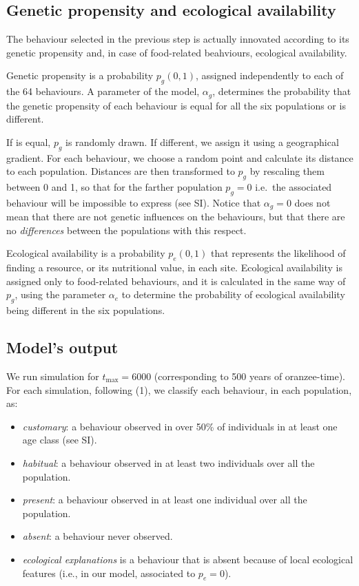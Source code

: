 \documentclass[9pt,twocolumn,twoside,]{pnas-new}
\begin{document}
\subsection*{Genetic propensity and ecological
availability}\label{format}

The behaviour selected in the previous step is actually innovated
according to its genetic propensity and, in case of food-related
beahviours, ecological availability.

Genetic propensity is a probability \(p_g(0,1)\), assigned independently
to each of the 64 behaviours. A parameter of the model, \(\alpha_g\),
determines the probability that the genetic propensity of each behaviour
is equal for all the six populations or is different.

If is equal, \(p_g\) is randomly drawn. If different, we assign it using
a geographical gradient. For each behaviour, we choose a random point
and calculate its distance to each population. Distances are then
transformed to \(p_g\) by rescaling them between 0 and 1, so that for
the farther population \(p_g=0\) i.e.~the associated behaviour will be
impossible to express (see SI). Notice that \(\alpha_g=0\) does not mean
that there are not genetic influences on the behaviours, but that there
are no \emph{differences} between the populations with this respect.

Ecological availability is a probability \(p_e(0,1)\) that represents
the likelihood of finding a resource, or its nutritional value, in each
site. Ecological availability is assigned only to food-related
behaviours, and it is calculated in the same way of \(p_g\), using the
parameter \(\alpha_e\) to determine the probability of ecological
availability being different in the six populations.

\subsection*{Model's output}\label{format}

We run simulation for \(t_\text{max}=6000\) (corresponding to 500 years
of oranzee-time). For each simulation, following (1), we classify each
behaviour, in each population, as:

\begin{itemize}
\item
  \emph{customary}: a behaviour observed in over 50\% of individuals in
  at least one age class (see SI).
\item
  \emph{habitual}: a behaviour observed in at least two individuals over
  all the population.
\item
  \emph{present}: a behaviour observed in at least one individual over
  all the population.
\item
  \emph{absent}: a behaviour never observed.
\item
  \emph{ecological explanations} is a behaviour that is absent because
  of local ecological features (i.e., in our model, associated to
  \(p_e=0\)).
\end{itemize}
\end{document}
